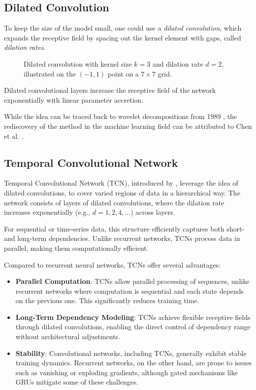 \subsection{Dilated Convolution}

To keep the size of the model small, one could use a \emph{dilated convolution}, which expands the receptive field by spacing out the kernel element with gaps, called \emph{dilation rates}.

\begin{figure}[ht!]
\centering

\caption[Dilated convolution.]{Dilated convolution with kernel size $k = 3$ and dilation rate $d = 2$, illustrated on the $(-1, 1)$ point on a $7 \times 7$ grid.}
\end{figure}

Dilated convolutional layers increase the receptive field of the network exponentially with linear parameter accretion. 

While the idea can be traced back to wavelet decompositions from 1989 \cite{Holschneider1989}, the rediscovery of the method in the machine learning field can be attributed to Chen et al. \cite{Chen2015}.

\subsection{Temporal Convolutional Network}

Temporal Convolutional Network (TCN), introduced by \cite{Colin2016}, leverage the idea of dilated convolutions, to cover varied regions of data in a hierarchical way. The network consists of layers of dilated convolutions, where the dilation rate increases exponentially (e.g., $d = 1, 2, 4, \dots$) across layers.

For sequential or time-series data, this structure efficiently captures both short- and long-term dependencies. Unlike recurrent networks, TCNs process data in parallel, making them computationally efficient.

Compared to recurrent neural networks, TCNs offer several advantages:
\begin{itemize}
	\item \textbf{Parallel Computation}: TCNs allow parallel processing of sequences, unlike recurrent networks where computation is sequential and each state depends on the previous one. This significantly reduces training time.
	\item \textbf{Long-Term Dependency Modeling}: TCNs achieve flexible receptive fields through dilated convolutions, enabling the direct control of dependency range without architectural adjustments.
	\item \textbf{Stability}: Convolutional networks, including TCNs, generally exhibit stable training dynamics. Recurrent networks, on the other hand, are prone to issues such as vanishing or exploding gradients, although gated mechanisms like GRUs mitigate some of these challenges. \end{itemize}

